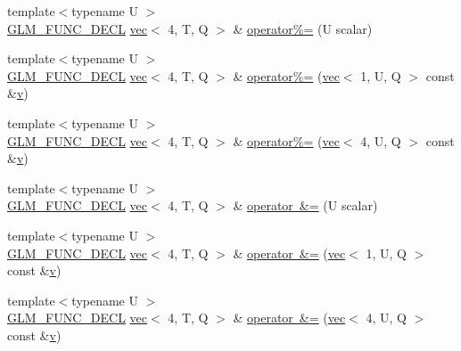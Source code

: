 \begin{DoxyCompactItemize}
\item 
{\footnotesize template$<$typename U $>$ }\\\mbox{\hyperlink{setup_8hpp_ab2d052de21a70539923e9bcbf6e83a51}{G\+L\+M\+\_\+\+F\+U\+N\+C\+\_\+\+D\+E\+CL}} \mbox{\hyperlink{structglm_1_1vec}{vec}}$<$ 4, T, Q $>$ \& \mbox{\hyperlink{structglm_1_1vec_3_014_00_01_t_00_01_q_01_4_a4887bc32b7edf48fc28dcfaca51f4172}{operator\%=}} (U scalar)
\item 
{\footnotesize template$<$typename U $>$ }\\\mbox{\hyperlink{setup_8hpp_ab2d052de21a70539923e9bcbf6e83a51}{G\+L\+M\+\_\+\+F\+U\+N\+C\+\_\+\+D\+E\+CL}} \mbox{\hyperlink{structglm_1_1vec}{vec}}$<$ 4, T, Q $>$ \& \mbox{\hyperlink{structglm_1_1vec_3_014_00_01_t_00_01_q_01_4_af2437a9e70535d7ae0c01c7be439c209}{operator\%=}} (\mbox{\hyperlink{structglm_1_1vec}{vec}}$<$ 1, U, Q $>$ const \&\mbox{\hyperlink{_s_d_l__opengl_8h_a10a82eabcb59d2fcd74acee063775f90}{v}})
\item 
{\footnotesize template$<$typename U $>$ }\\\mbox{\hyperlink{setup_8hpp_ab2d052de21a70539923e9bcbf6e83a51}{G\+L\+M\+\_\+\+F\+U\+N\+C\+\_\+\+D\+E\+CL}} \mbox{\hyperlink{structglm_1_1vec}{vec}}$<$ 4, T, Q $>$ \& \mbox{\hyperlink{structglm_1_1vec_3_014_00_01_t_00_01_q_01_4_a10da98a89881a5135b526ceaa75c6f13}{operator\%=}} (\mbox{\hyperlink{structglm_1_1vec}{vec}}$<$ 4, U, Q $>$ const \&\mbox{\hyperlink{_s_d_l__opengl_8h_a10a82eabcb59d2fcd74acee063775f90}{v}})
\item 
{\footnotesize template$<$typename U $>$ }\\\mbox{\hyperlink{setup_8hpp_ab2d052de21a70539923e9bcbf6e83a51}{G\+L\+M\+\_\+\+F\+U\+N\+C\+\_\+\+D\+E\+CL}} \mbox{\hyperlink{structglm_1_1vec}{vec}}$<$ 4, T, Q $>$ \& \mbox{\hyperlink{structglm_1_1vec_3_014_00_01_t_00_01_q_01_4_a16aab24048ca1e0f7508c80daad228ca}{operator \&=}} (U scalar)
\item 
{\footnotesize template$<$typename U $>$ }\\\mbox{\hyperlink{setup_8hpp_ab2d052de21a70539923e9bcbf6e83a51}{G\+L\+M\+\_\+\+F\+U\+N\+C\+\_\+\+D\+E\+CL}} \mbox{\hyperlink{structglm_1_1vec}{vec}}$<$ 4, T, Q $>$ \& \mbox{\hyperlink{structglm_1_1vec_3_014_00_01_t_00_01_q_01_4_a0367ad867801ac2e7112bfe8a95e996e}{operator \&=}} (\mbox{\hyperlink{structglm_1_1vec}{vec}}$<$ 1, U, Q $>$ const \&\mbox{\hyperlink{_s_d_l__opengl_8h_a10a82eabcb59d2fcd74acee063775f90}{v}})
\item 
{\footnotesize template$<$typename U $>$ }\\\mbox{\hyperlink{setup_8hpp_ab2d052de21a70539923e9bcbf6e83a51}{G\+L\+M\+\_\+\+F\+U\+N\+C\+\_\+\+D\+E\+CL}} \mbox{\hyperlink{structglm_1_1vec}{vec}}$<$ 4, T, Q $>$ \& \mbox{\hyperlink{structglm_1_1vec_3_014_00_01_t_00_01_q_01_4_adc70eea7b85cb2849ff51803b85f1605}{operator \&=}} (\mbox{\hyperlink{structglm_1_1vec}{vec}}$<$ 4, U, Q $>$ const \&\mbox{\hyperlink{_s_d_l__opengl_8h_a10a82eabcb59d2fcd74acee063775f90}{v}})

\end{DoxyCompactItemize}
